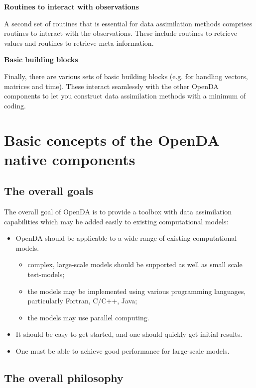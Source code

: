 \textbf{Routines to interact with observations}

A second set of routines that is essential for data assimilation methods comprises routines to interact with the observations. These include routines to retrieve values and routines to retrieve meta-information.

\textbf{Basic building blocks}

Finally, there are various sets of basic building blocks (e.g. for handling vectors, matrices and time). These interact seamlessly with the other OpenDA components to let you construct data assimilation methods with a minimum of coding.

\section{Basic concepts of the OpenDA native components}

\subsection{The overall goals}

The overall goal of OpenDA is to provide a toolbox with data assimilation capabilities which may be added easily to existing computational models:

\begin{itemize}
\item OpenDA should be applicable to a wide range of existing computational models.
\begin{itemize}
\item complex, large-scale models should be supported as well as small scale test-models;
\item the models may be implemented using various programming languages, particularly Fortran, C/C++, Java;
\item the models may use parallel computing.
\end{itemize}
\item It should be easy to get started, and one should quickly get initial results.
\item One must be able to achieve good performance for large-scale models.
\end{itemize}

\subsection{The overall philosophy}

